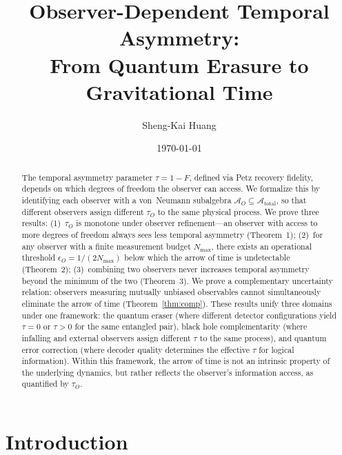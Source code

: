 \documentclass[prl,twocolumn,superscriptaddress,longbibliography,floatfix]{revtex4-2}
\newcommand{\tauasym}{\tau}
\newcommand{\algO}{\mathcal{A}}
\begin{document}
\title{Observer-Dependent Temporal Asymmetry:\\
From Quantum Erasure to Gravitational Time}

\author{Sheng-Kai Huang}

\date{\today}

\begin{abstract}
The temporal asymmetry parameter $\tauasym = 1 - F$, defined via
Petz recovery fidelity, depends on which degrees of freedom the
observer can access.  We formalize this by identifying each observer
with a von~Neumann subalgebra $\algO_O \subseteq \algO_{\mathrm{total}}$,
so that different observers assign different $\tauasym_O$ to the
same physical process.  We prove three results:
(1)~$\tauasym_O$ is monotone under observer refinement---an
observer with access to more degrees of freedom always sees less
temporal asymmetry (Theorem~1);
(2)~for any observer with a finite measurement budget $N_{\max}$,
there exists an operational threshold
$\epsilon_O = 1/(2N_{\max})$ below which the arrow of time is
undetectable (Theorem~2);
(3)~combining two observers never increases temporal asymmetry
beyond the minimum of the two (Theorem~3).
We prove a complementary uncertainty relation:
observers measuring mutually unbiased observables cannot
simultaneously eliminate the arrow of time (Theorem~\ref{thm:comp}).
These results unify three domains under one framework:
the quantum eraser (where different detector configurations yield
$\tauasym = 0$ or $\tauasym > 0$ for the same entangled pair),
black hole complementarity (where infalling and external observers
assign different $\tauasym$ to the same process), and quantum
error correction (where decoder quality determines the effective
$\tauasym$ for logical information).
Within this framework, the arrow of time is not an intrinsic
property of the underlying dynamics, but rather reflects the
observer's information access, as quantified by $\tauasym_O$.
\end{abstract}

\maketitle

\section{Introduction}
\label{sec:intro}
\end{document}
